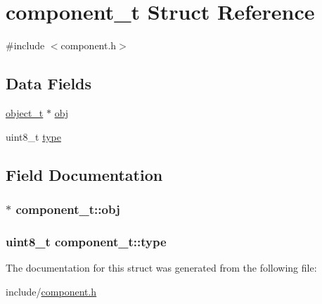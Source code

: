\hypertarget{structcomponent__t}{}\section{component\+\_\+t Struct Reference}
\label{structcomponent__t}


{\ttfamily \#include $<$component.\+h$>$}

\subsection*{Data Fields}
\begin{DoxyCompactItemize}
\item 
\hyperlink{structobject__t}{object\+\_\+t} $\ast$ \hyperlink{structcomponent__t_a91ca5a259f6a90c3ed6e3cf433c30537}{obj}
\item 
uint8\+\_\+t \hyperlink{structcomponent__t_a540e44777d93cf3b028acee101676dc5}{type}
\end{DoxyCompactItemize}


\subsection{Field Documentation}
\subsubsection[{\texorpdfstring{obj}{obj}}]{$\ast$ component\+\_\+t\+::obj}\hypertarget{structcomponent__t_a91ca5a259f6a90c3ed6e3cf433c30537}{}\label{structcomponent__t_a91ca5a259f6a90c3ed6e3cf433c30537}
\subsubsection[{\texorpdfstring{type}{type}}]{\setlength{\rightskip}{0pt plus 5cm}uint8\+\_\+t component\+\_\+t\+::type}\hypertarget{structcomponent__t_a540e44777d93cf3b028acee101676dc5}{}\label{structcomponent__t_a540e44777d93cf3b028acee101676dc5}


The documentation for this struct was generated from the following file\+:\begin{DoxyCompactItemize}
\item 
include/\hyperlink{component_8h}{component.\+h}\end{DoxyCompactItemize}
